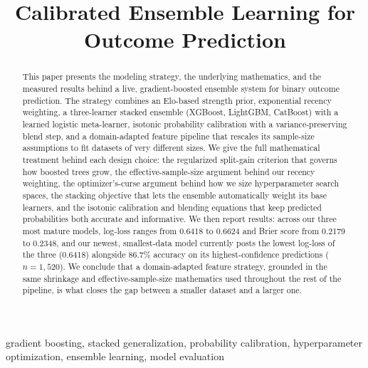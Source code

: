 \documentclass[conference]{IEEEtran}
\begin{document}
\title{Calibrated Ensemble Learning for Outcome Prediction}

\author{
}

\maketitle

\begin{abstract}
This paper presents the modeling strategy, the underlying mathematics,
and the measured results behind a live, gradient-boosted ensemble
system for binary outcome prediction. The strategy combines an
Elo-based strength prior, exponential recency weighting, a
three-learner stacked ensemble (XGBoost, LightGBM, CatBoost) with a
learned logistic meta-learner, isotonic probability calibration with
a variance-preserving blend step, and a domain-adapted feature
pipeline that rescales its sample-size assumptions to fit datasets of
very different sizes. We give the full mathematical treatment behind
each design choice: the regularized split-gain criterion that governs
how boosted trees grow, the effective-sample-size argument behind our
recency weighting, the optimizer's-curse argument behind how we size
hyperparameter search spaces, the stacking objective that lets the
ensemble automatically weight its base learners, and the isotonic
calibration and blending equations that keep predicted probabilities
both accurate and informative. We then report results: across our
three most mature models, log-loss ranges from 0.6418 to 0.6624 and
Brier score from 0.2179 to 0.2348, and our newest, smallest-data model
currently posts the lowest log-loss of the three (0.6418) alongside
86.7\% accuracy on its highest-confidence predictions
($n=1{,}520$). We conclude that a domain-adapted feature strategy,
grounded in the same shrinkage and effective-sample-size mathematics
used throughout the rest of the pipeline, is what closes the gap
between a smaller dataset and a larger one.
\end{abstract}

\begin{IEEEkeywords}
gradient boosting, stacked generalization, probability calibration,
hyperparameter optimization, ensemble learning, model evaluation
\end{IEEEkeywords}
\end{document}
